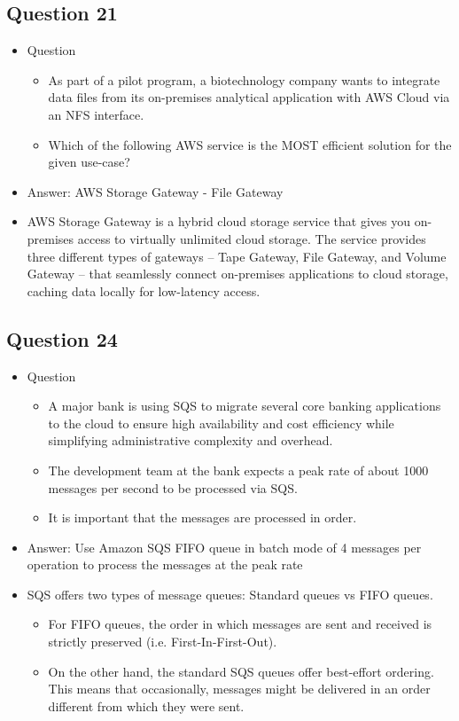 \documentclass[]{scrartcl}
\begin{document}
\subsection{Question 21}
\begin{itemize}
	\item Question
	\begin{itemize}
		\item As part of a pilot program, a biotechnology company wants to integrate data files from its on-premises analytical application with AWS Cloud via an NFS interface.
		\item Which of the following AWS service is the MOST efficient solution for the given use-case?
	\end{itemize}
	\item Answer: AWS Storage Gateway - File Gateway
	\item AWS Storage Gateway is a hybrid cloud storage service that gives you on-premises access to virtually unlimited cloud storage. The service provides three different types of gateways – Tape Gateway, File Gateway, and Volume Gateway – that seamlessly connect on-premises applications to cloud storage, caching data locally for low-latency access.
\end{itemize}

\subsection{Question 24}
\begin{itemize}
	\item Question
	\begin{itemize}
		\item A major bank is using SQS to migrate several core banking applications to the cloud to ensure high availability and cost efficiency while simplifying administrative complexity and overhead. 
		\item The development team at the bank expects a peak rate of about 1000 messages per second to be processed via SQS. 
		\item It is important that the messages are processed in order.
	\end{itemize}
	\item Answer: Use Amazon SQS FIFO queue in batch mode of 4 messages per operation to process the messages at the peak rate
	\item SQS offers two types of message queues: Standard queues vs FIFO queues.
	\begin{itemize}
		\item For FIFO queues, the order in which messages are sent and received is strictly preserved (i.e. First-In-First-Out).
		\item On the other hand, the standard SQS queues offer best-effort ordering. This means that occasionally, messages might be delivered in an order different from which they were sent.
	\end{itemize}
\end{itemize}
\end{document}
